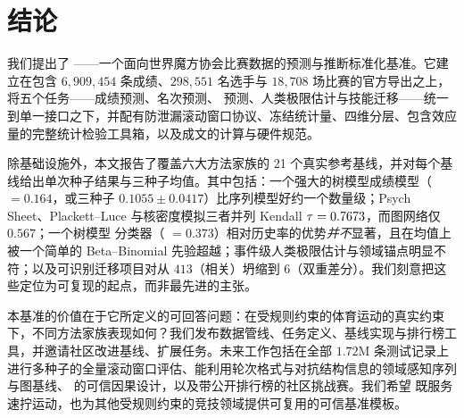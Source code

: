 \section{结论}
\label{sec:conclusion}

我们提出了 \wcabench{}——一个面向世界魔方协会比赛数据的预测与推断标准化基准。它建立在包含 $6{,}909{,}454$ 条成绩、$298{,}551$ 名选手与 $18{,}708$ 场比赛的官方导出之上，将五个任务——成绩预测、名次预测、\DNF{} 预测、人类极限估计与技能迁移——统一到单一接口之下，并配有防泄漏滚动窗口协议、冻结统计量、四维分层、包含效应量的完整统计检验工具箱，以及成文的计算与硬件规范。

除基础设施外，本文报告了覆盖六大方法家族的 21 个真实参考基线，并对每个基线给出单次种子结果与三种子均值。其中包括：一个强大的树模型成绩模型（\maelog{} $=0.164$，或三种子 $0.1055\pm0.0417$）比序列模型好约一个数量级；Psych Sheet、Plackett--Luce 与核密度模拟三者并列 Kendall $\tau=0.7673$，而图网络仅 $0.567$；一个树模型 \DNF{} 分类器（\aucpr{} $=0.373$）相对历史率的优势\emph{并不}显著，且在均值上被一个简单的 Beta--Binomial 先验超越；事件级人类极限估计与领域锚点明显不符；以及可识别迁移项目对从 $413$（相关）坍缩到 $6$（双重差分）。我们刻意把这些定位为可复现的起点，而非最先进的主张。

本基准的价值在于它所定义的可回答问题：在受规则约束的体育运动的真实约束下，不同方法家族表现如何？我们发布数据管线、任务定义、基线实现与排行榜工具，并邀请社区改进基线、扩展任务。未来工作包括在全部 $1.72$M 条测试记录上进行多种子的全量滚动窗口评估、能利用轮次格式与对抗结构信息的领域感知序列与图基线、 的可信因果设计，以及带公开排行榜的社区挑战赛。我们希望 \wcabench{} 既服务速拧运动，也为其他受规则约束的竞技领域提供可复用的可信基准模板。
